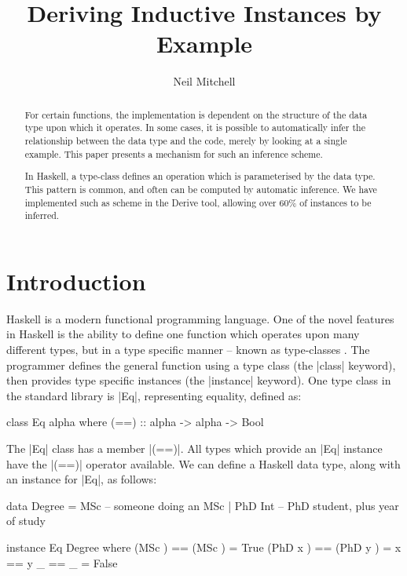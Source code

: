 \documentclass{llncs}
\begin{document}
\title{Deriving Inductive Instances by Example}
\author{Neil Mitchell}


\maketitle

\begin{abstract}
For certain functions, the implementation is dependent on the structure of the data type upon which it operates. In some cases, it is possible to automatically infer the relationship between the data type and the code, merely by looking at a single example. This paper presents a mechanism for such an inference scheme.

In Haskell, a type-class defines an operation which is parameterised by the data type. This pattern is common, and often can be computed by automatic inference. We have implemented such as scheme in the Derive tool, allowing over 60\% of instances to be inferred.
\end{abstract}

\section{Introduction}

Haskell \cite{haskell} is a modern functional programming language. One of the novel features in Haskell is the ability to define one function which operates upon many different types, but in a type specific manner -- known as type-classes \cite{wadler:type_classes}. The programmer defines the general function using a type class (the |class| keyword), then provides type specific instances (the |instance| keyword). One type class in the standard library is |Eq|, representing equality, defined as:

\begin{code}
class Eq alpha where
    (==) :: alpha -> alpha -> Bool
\end{code}

The |Eq| class has a member |(==)|. All types which provide an |Eq| instance have the |(==)| operator available. We can define a Haskell data type, along with an instance for |Eq|, as follows:

\begin{code}
data Degree  =  MSc        -- someone doing an MSc
             |  PhD Int    -- PhD student, plus year of study

instance Eq Degree where
    (MSc    )  == (MSc    )  = True
    (PhD x  )  == (PhD y  )  = x == y
    _          == _          = False
\end{code}
\end{document}
